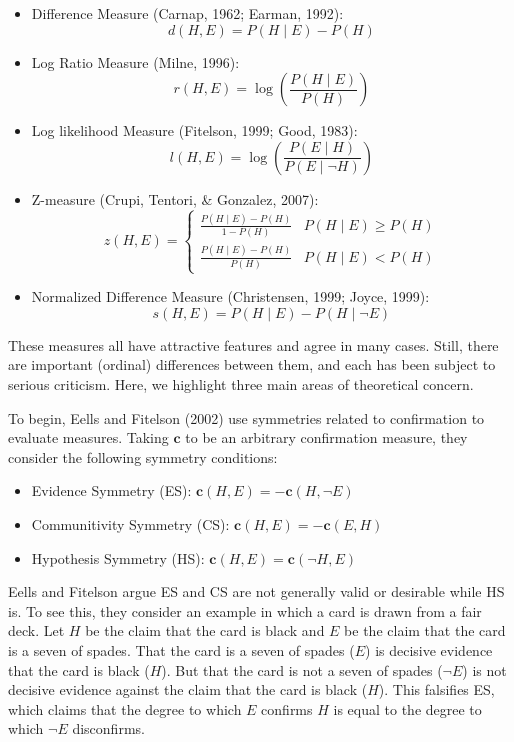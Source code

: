 \documentclass[10pt, letterpaper]{article}
\begin{document}
\begin{itemize}
\item
  Difference Measure (Carnap, 1962; Earman, 1992):
  \[d(H,E)=P(H \mid E)-P(H)\]
\item
  Log Ratio Measure (Milne, 1996):
  \[r(H,E)=\log\left(\frac{P(H \mid E)}{P(H)}\right)\]
\item
  Log likelihood Measure (Fitelson, 1999; Good, 1983):
  \[l(H,E)=\log\left(\frac{P(E \mid H)}{P(E \mid \neg H)}\right)\]
\item
  Z-measure (Crupi, Tentori, \& Gonzalez, 2007): \[
  z(H,E) = \begin{cases}
  \frac{P(H \mid E) - P(H)}{1-P(H)}  &  P(H \mid E) \geq P(H) \\
  \frac{P(H \mid E) - P(H)}{P(H)} & P(H \mid E) < P(H)
  \end{cases}
  \]
\item
  Normalized Difference Measure (Christensen, 1999; Joyce, 1999):
  \[s(H,E)=P(H \mid E)-P(H \mid \neg E)\]
\end{itemize}

These measures all have attractive features and agree in many cases.
Still, there are important (ordinal) differences between them, and each
has been subject to serious criticism. Here, we highlight three main
areas of theoretical concern.

To begin, Eells and Fitelson (2002) use symmetries related to
confirmation to evaluate measures. Taking \(\mathbf{c}\) to be an
arbitrary confirmation measure, they consider the following symmetry
conditions:

\begin{itemize}
\item
  Evidence Symmetry (ES): \(\mathbf{c}(H,E)=-\mathbf{c}(H, \neg E)\)
\item
  Communitivity Symmetry (CS): \(\mathbf{c}(H,E)=-\mathbf{c}(E, H)\)
\item
  Hypothesis Symmetry (HS): \(\mathbf{c}(H,E)= \mathbf{c}(\neg H, E)\)
\end{itemize}

Eells and Fitelson argue ES and CS are not generally valid or desirable
while HS is. To see this, they consider an example in which a card is
drawn from a fair deck. Let \(H\) be the claim that the card is black
and \(E\) be the claim that the card is a seven of spades. That the card
is a seven of spades (\(E\)) is decisive evidence that the card is black
(\(H\)). But that the card is not a seven of spades (\(\neg E\)) is not
decisive evidence against the claim that the card is black (\(H\)). This
falsifies ES, which claims that the degree to which \(E\) confirms \(H\)
is equal to the degree to which \(\neg E\) disconfirms.
\end{document}
